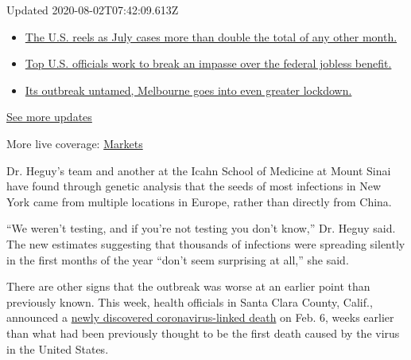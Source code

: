 Updated 2020-08-02T07:42:09.613Z

\begin{itemize}
\tightlist
\item
  \href{https://www.nytimes.com/2020/08/01/world/coronavirus-covid-19.html?action=click\&pgtype=Article\&state=default\&region=MAIN_CONTENT_1\&context=storylines_live_updates\#link-34047410}{The
  U.S. reels as July cases more than double the total of any other
  month.}
\item
  \href{https://www.nytimes.com/2020/08/01/world/coronavirus-covid-19.html?action=click\&pgtype=Article\&state=default\&region=MAIN_CONTENT_1\&context=storylines_live_updates\#link-780ec966}{Top
  U.S. officials work to break an impasse over the federal jobless
  benefit.}
\item
  \href{https://www.nytimes.com/2020/08/01/world/coronavirus-covid-19.html?action=click\&pgtype=Article\&state=default\&region=MAIN_CONTENT_1\&context=storylines_live_updates\#link-2bc8948}{Its
  outbreak untamed, Melbourne goes into even greater lockdown.}
\end{itemize}

\href{https://www.nytimes.com/2020/08/01/world/coronavirus-covid-19.html?action=click\&pgtype=Article\&state=default\&region=MAIN_CONTENT_1\&context=storylines_live_updates}{See
more updates}

More live coverage:
\href{https://www.nytimes.com/live/2020/07/31/business/stock-market-today-coronavirus?action=click\&pgtype=Article\&state=default\&region=MAIN_CONTENT_1\&context=storylines_live_updates}{Markets}

Dr. Heguy's team and another at the Icahn School of Medicine at Mount
Sinai have found through genetic analysis that the seeds of most
infections in New York came from multiple locations in Europe, rather
than directly from China.

``We weren't testing, and if you're not testing you don't know,'' Dr.
Heguy said. The new estimates suggesting that thousands of infections
were spreading silently in the first months of the year ``don't seem
surprising at all,'' she said.

There are other signs that the outbreak was worse at an earlier point
than previously known. This week, health officials in Santa Clara
County, Calif., announced a
\href{https://www.nytimes.com/2020/04/22/us/santa-clara-county-coronavirus-death.html}{newly
discovered coronavirus-linked death} on Feb. 6, weeks earlier than what
had been previously thought to be the first death caused by the virus in
the United States.

